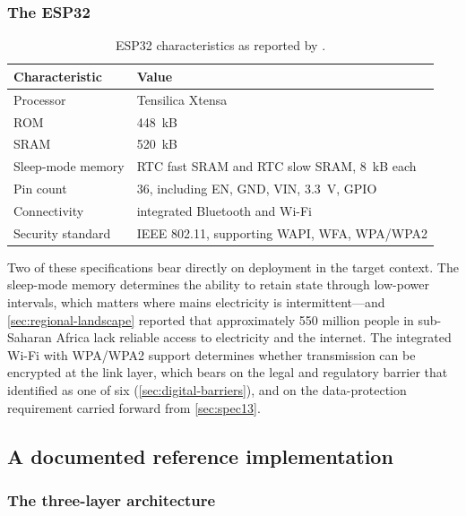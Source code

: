 \documentclass[12pt,a4paper,oneside]{report}
\begin{document}
\subsubsection{The ESP32}

\begin{table}[htbp]
\centering\small
\caption{ESP32 characteristics as reported by \textcite{efendi2025}.}\label{tab:esp32}
\begin{tabularx}{\textwidth}{@{}>{\raggedright\arraybackslash}p{4.0cm} X@{}}
\toprule
\textbf{Characteristic} & \textbf{Value} \\
\midrule
Processor & Tensilica Xtensa \\
ROM & 448~kB \\
SRAM & 520~kB \\
Sleep-mode memory & RTC fast SRAM and RTC slow SRAM, 8~kB each \\
Pin count & 36, including EN, GND, VIN, 3.3~V, GPIO \\
Connectivity & integrated Bluetooth and Wi-Fi \\
Security standard & IEEE 802.11, supporting WAPI, WFA, WPA/WPA2 \\
\bottomrule
\end{tabularx}
\end{table}

Two of these specifications bear directly on deployment in the target context. The sleep-mode memory determines the ability to retain state through low-power intervals, which matters where mains electricity is intermittent---and \cref{sec:regional-landscape} reported that approximately 550 million people in sub-Saharan Africa lack reliable access to electricity and the internet. The integrated Wi-Fi with WPA/WPA2 support determines whether transmission can be encrypted at the link layer, which bears on the legal and regulatory barrier that \textcite{dodoo2022} identified as one of six (\cref{sec:digital-barriers}), and on the data-protection requirement carried forward from \cref{sec:spec13}.

\subsection{A documented reference implementation}\label{sec:reference-impl}

\subsubsection{The three-layer architecture}
\end{document}
